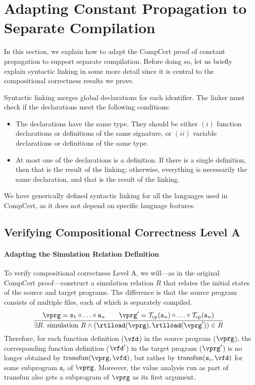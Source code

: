 \section{Adapting Constant Propagation to Separate Compilation}
\label{sec:sepcomp:constprop}

In this section, we explain how to adapt the CompCert proof of
constant propagation to support separate compilation.  Before doing
so, let us briefly explain syntactic linking in some more detail since
it is central to the compositional correctness results we prove.

Syntactic linking merges global declarations for each identifier.
The linker must check if the declarations meet the following conditions:
\begin{itemize}
\item The declarations have the same type.  They should be either
  $(i)$ function declarations or definitions of the same signature, or
  $(ii)$ variable declarations or definitions of the same type.
\item At most one of the declarations is a definition.  If there is a
  single definition, then that is the result of the linking;
  otherwise, everything is necessarily the same declaration, and that
  is the result of the linking.
\end{itemize}
\noindent We have generically defined syntactic linking for all the
languages used in CompCert, as it does not depend on specific language
features.


\subsection{Verifying Compositional Correctness Level A}

\paragraph{Adapting the Simulation Relation Definition}

To verify compositional correctness Level A, we will---as in the
original CompCert proof---construct a simulation relation $R$ that
relates the initial states of the source and target programs.  The
difference is that the source program consists of multiple files, each
of which is separately compiled.
\[
\frac{
\begin{array}{@{}c@{}}
\vprg = \mathtt{s}_1\circ \ldots \circ \mathtt{s}_n \qquad
\vprg' = \mathcal{T}_\mathrm{cp}(\mathtt{s}_n)\circ \ldots \circ \mathcal{T}_\mathrm{cp}(\mathtt{s}_n)
\end{array}
}
{\exists R.~ \mathrm{simulation}~R \land (\rtlload(\vprg),\rtlload(\vprg'))\in R
}
\]
Therefore, for each function definition ($\vfd$) in the source program
($\vprg$), the corresponding function definition ($\vfd'$) in the
target program ($\vprg'$) is no longer obtained by
$\mathrm{transfun}(\vprg,\vfd)$, but rather by
$\mathrm{transfun}(\mathtt{s}_i,\vfd)$ for some subprogram
$\mathtt{s}_i$ of $\vprg$.  Moreover, the value analysis run as part
of $\mathrm{transfun}$ also gets a subprogram of $\vprg$ as its first
argument.

